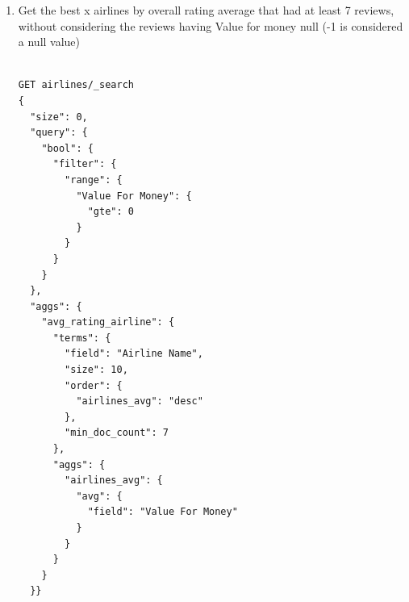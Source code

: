 \documentclass{Configuration_Files/PoliMi3i_thesis}
\begin{document}
\begin{enumerate}
\begin{figure}[H]
\end{figure}

\newpage
    
    \item Get the best x airlines by overall rating average that had at least 7 reviews, without considering the reviews having Value for money null (-1 is considered a null value)

    \begin{verbatim}
        
GET airlines/_search
{
  "size": 0,
  "query": {
    "bool": {
      "filter": {
        "range": {
          "Value For Money": {
            "gte": 0
          }
        }
      }
    }
  },
  "aggs": {
    "avg_rating_airline": {
      "terms": {
        "field": "Airline Name",
        "size": 10,
        "order": {
          "airlines_avg": "desc"
        },
        "min_doc_count": 7
      },
      "aggs": {
        "airlines_avg": {
          "avg": {
            "field": "Value For Money"
          }
        }
      }
    }
  }}
    \end{verbatim}
\end{enumerate}
\end{document}
